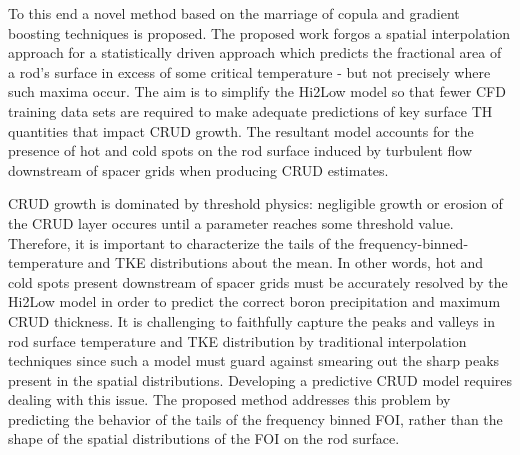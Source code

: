 To this end a novel method based on the marriage of copula and gradient boosting techniques
is proposed.  The proposed work forgos a spatial interpolation
approach for a statistically driven approach which predicts the fractional
area of a rod's surface in excess of some critical temperature - but not
precisely where such maxima occur.  The aim is to simplify the Hi2Low model 
so that fewer CFD training data sets are required
to make adequate predictions of key surface TH quantities that impact CRUD growth.  
The resultant model accounts for the presence of
hot and cold spots on the rod surface induced by turbulent flow downstream of spacer grids
when producing CRUD estimates.

CRUD growth is dominated by threshold physics: negligible growth or
erosion of the CRUD layer occures until a parameter reaches some threshold value.  Therefore, it is
important to characterize the tails of the frequency-binned-temperature and
TKE distributions about the mean.  In other words, hot and cold spots
present downstream of spacer grids must be accurately resolved by the Hi2Low model
in order to predict the correct boron precipitation and maximum CRUD
thickness.  It is challenging to faithfully capture the peaks and valleys in
rod surface temperature and TKE distribution by traditional interpolation
techniques since such a model must guard against smearing out the sharp peaks
present in the spatial distributions.  Developing a predictive CRUD model requires
dealing with this issue. The proposed method addresses this problem by predicting
the behavior of the tails of the frequency binned FOI, rather than the shape of the
spatial distributions of the FOI on the rod surface.

